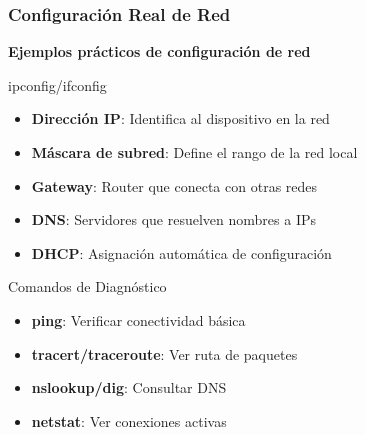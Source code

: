 \documentclass[aspectratio=169]{beamer}
\begin{document}
          
          \begin{frame}
            \frametitle{Configuración Real de Red}
            
            \begin{center}
            \Large \textbf{Ejemplos prácticos de configuración de red}
            \end{center}
            
            \begin{block}{ipconfig/ifconfig}
            \begin{itemize}
            \item \textbf{Dirección IP}: Identifica al dispositivo en la red
            \item \textbf{Máscara de subred}: Define el rango de la red local
            \item \textbf{Gateway}: Router que conecta con otras redes
            \item \textbf{DNS}: Servidores que resuelven nombres a IPs
            \item \textbf{DHCP}: Asignación automática de configuración
            \end{itemize}
            \end{block}
            
            \begin{block}{Comandos de Diagnóstico}
            \begin{itemize}
            \item \textbf{ping}: Verificar conectividad básica
            \item \textbf{tracert/traceroute}: Ver ruta de paquetes
            \item \textbf{nslookup/dig}: Consultar DNS
            \item \textbf{netstat}: Ver conexiones activas
            \end{itemize}
            \end{block}
            \end{frame}
            
\end{document}
